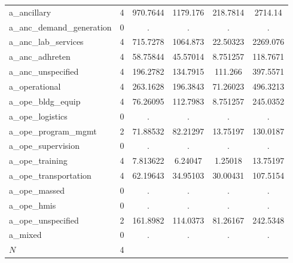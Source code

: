 \begin{table}[htbp]
\begin{tabular}{l*{1}{ccccc}}
a\_ancillary &           4&    970.7644&    1179.176&    218.7814&     2714.14\\
a\_anc\_demand\_generation&           0&           .&           .&           .&           .\\
a\_anc\_lab\_services&           4&    715.7278&    1064.873&    22.50323&    2269.076\\
a\_anc\_adhreten&           4&    58.75844&    45.57014&    8.751257&    118.7671\\
a\_anc\_unspecified&           4&    196.2782&    134.7915&     111.266&    397.5571\\
a\_operational&           4&    263.1628&    196.3843&    71.26023&    496.3213\\
a\_ope\_bldg\_equip&           4&    76.26095&    112.7983&    8.751257&    245.0352\\
a\_ope\_logistics&           0&           .&           .&           .&           .\\
a\_ope\_program\_mgmt&           2&    71.88532&    82.21297&    13.75197&    130.0187\\
a\_ope\_supervision&           0&           .&           .&           .&           .\\
a\_ope\_training&           4&    7.813622&     6.24047&     1.25018&    13.75197\\
a\_ope\_transportation&           4&    62.19643&    34.95103&    30.00431&    107.5154\\
a\_ope\_massed&           0&           .&           .&           .&           .\\
a\_ope\_hmis  &           0&           .&           .&           .&           .\\
a\_ope\_unspecified&           2&    161.8982&    114.0373&    81.26167&    242.5348\\
a\_mixed     &           0&           .&           .&           .&           .\\
\hline
\(N\)       &           4&            &            &            &            \\
\hline\hline
\end{tabular}
\end{table}
